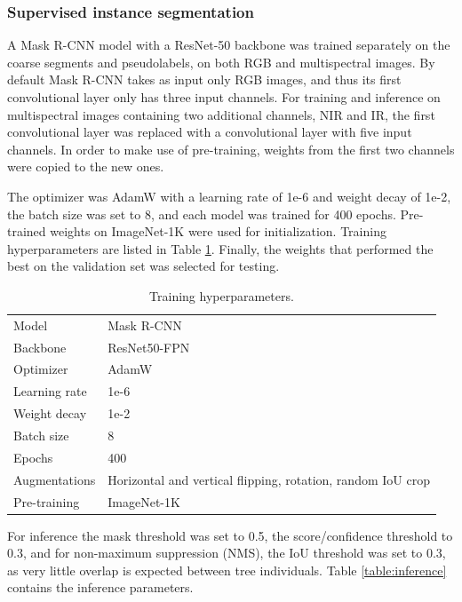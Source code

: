 \documentclass[english, 12pt, a4paper, sci, utf8, a-2b, online]{aaltothesis}
\begin{document}
\subsubsection{Supervised instance segmentation}

A Mask R-CNN model with a ResNet-50 \cite{resnet} backbone was trained separately on the coarse segments and pseudolabels, on both RGB and multispectral images. By default Mask R-CNN takes as input only RGB images, and thus its first convolutional layer only has three input channels. For training and inference on multispectral images containing two additional channels, NIR and IR, the first convolutional layer was replaced with a convolutional layer with five input channels. In order to make use of pre-training, weights from the first two channels were copied to the new ones.

The optimizer was AdamW \cite{adamw} with a learning rate of 1e-6 and weight decay of 1e-2, the batch size was set to 8, and each model was trained for 400 epochs. Pre-trained weights on ImageNet-1K \cite{imagenet1k} were used for initialization. Training hyperparameters are listed in Table \ref{table:train}. Finally, the weights that performed the best on the validation set was selected for testing.

\begin{table}[h]
    \centering
    \begin{tabular}{ll}
    Model & Mask R-CNN \\
    Backbone & ResNet50-FPN \\
    Optimizer & AdamW \\
    Learning rate & 1e-6 \\
    Weight decay & 1e-2 \\
    Batch size & 8 \\
    Epochs & 400 \\
    Augmentations & Horizontal and vertical flipping, rotation, random IoU crop \\
    Pre-training & ImageNet-1K \\
    \end{tabular}
    \caption{Training hyperparameters.}
    \label{table:train}
\end{table}

For inference the mask threshold was set to 0.5, the score/confidence threshold to 0.3, and for non-maximum suppression (NMS), the IoU threshold was set to 0.3, as very little overlap is expected between tree individuals. Table \ref{table:inference} contains the inference parameters.
\end{document}
